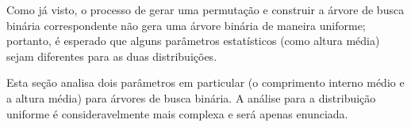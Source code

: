 Como já visto,
o processo de gerar uma permutação e construir a árvore de busca binária correspondente
não gera uma árvore binária de maneira uniforme;
portanto,
é esperado que alguns parâmetros estatísticos
(como altura média)
sejam diferentes para as duas distribuições.

Esta seção analisa dois parâmetros em particular
(o comprimento interno médio e a altura média)
para árvores de busca binária.
A análise para a distribuição uniforme é consideravelmente mais complexa
e será apenas enunciada.
